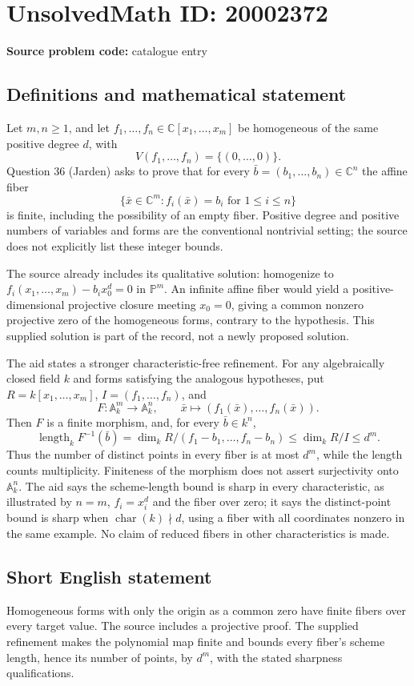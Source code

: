 \documentclass[11pt]{article}
\newcommand{\C}{\mathbb{C}}
\newcommand{\A}{\mathbb{A}}
\newcommand{\PP}{\mathbb{P}}
\begin{document}
\section*{UnsolvedMath ID: 20002372}
\textbf{Source problem code:} catalogue entry
\subsection{Definitions and mathematical statement}
Let $m,n\geq1$, and let $f_1,\ldots,f_n\in\C[x_1,\ldots,x_m]$ be homogeneous of the same positive degree $d$, with
\[
V(f_1,\ldots,f_n)=\{(0,\ldots,0)\}.
\]
Question 36 (Jarden) asks to prove that for every $\bar b=(b_1,\ldots,b_n)\in\C^n$ the affine fiber
\[
\{\bar x\in\C^m:f_i(\bar x)=b_i\text{ for }1\leq i\leq n\}
\]
is finite, including the possibility of an empty fiber. Positive degree and positive numbers of variables and forms are the conventional nontrivial setting; the source does not explicitly list these integer bounds.

The source already includes its qualitative solution: homogenize to $f_i(x_1,\ldots,x_m)-b_i x_0^d=0$ in $\PP^m$. An infinite affine fiber would yield a positive-dimensional projective closure meeting $x_0=0$, giving a common nonzero projective zero of the homogeneous forms, contrary to the hypothesis. This supplied solution is part of the record, not a newly proposed solution.

The aid states a stronger characteristic-free refinement. For any algebraically closed field $k$ and forms satisfying the analogous hypotheses, put $R=k[x_1,\ldots,x_m]$, $I=(f_1,\ldots,f_n)$, and
\[
F:\A_k^m\longrightarrow\A_k^n,\qquad\bar x\longmapsto(f_1(\bar x),\ldots,f_n(\bar x)).
\]
Then $F$ is a finite morphism, and, for every $\bar b\in k^n$,
\[
\operatorname{length}_k F^{-1}(\bar b)
=\dim_k R/(f_1-b_1,\ldots,f_n-b_n)
\leq\dim_k R/I\leq d^m.
\]
Thus the number of distinct points in every fiber is at most $d^m$, while the length counts multiplicity. Finiteness of the morphism does not assert surjectivity onto $\A_k^n$. The aid says the scheme-length bound is sharp in every characteristic, as illustrated by $n=m$, $f_i=x_i^d$ and the fiber over zero; it says the distinct-point bound is sharp when $\operatorname{char}(k)\nmid d$, using a fiber with all coordinates nonzero in the same example. No claim of reduced fibers in other characteristics is made.
\subsection{Short English statement}
Homogeneous forms with only the origin as a common zero have finite fibers over every target value. The source includes a projective proof. The supplied refinement makes the polynomial map finite and bounds every fiber's scheme length, hence its number of points, by $d^m$, with the stated sharpness qualifications.
\end{document}
